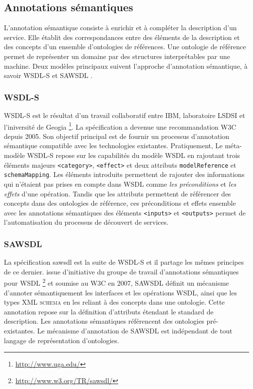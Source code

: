   \subsection{Annotations sémantiques}
  \label{sec:semantic-annot}

  L'annotation sémantique consiste à enrichir et à compléter la
  description d'un service. Elle établit des correspondances entre des
  éléments de la description et des concepts d'un ensemble
  d'ontologies de références. Une ontologie de référence permet de
  représenter un domaine par des structures interprétables par une
  machine. Deux modèles principaux suivent l'approche d'annotation
  sémantique, à savoir \textsc{WSDL-S} et \textsc{SAWSDL}
  \cite{elie2010}.

    \subsubsection{WSDL-S}
    \textsc{WSDL-S} \cite{akkiraju2005web} est le résultat d'un
    travail collaboratif entre IBM, laboratoire LSDSI et l'iniversité
    de Geogia \footnote{\url{http://www.uga.edu/}}.  La spécification
    a devenue une recommandation \textsc{W3C} depuis 2005. Son
    objectif principal est de fournir un processus d'annotation
    sémantique compatible avec les technologies
    existantes. Pratiquement, Le méta-modèle \textsc{WSDL-S} repose
    sur les capabilités du modèle \textsc{WSDL} en rajoutant trois
    éléments majeurs \texttt{<category>}, \texttt{<effect>} et deux
    attributs \texttt{modelReference} et \texttt{schemaMapping}. Les
    éléments introduits permettent de rajouter des informations qui
    n'étaient pas prises en compte dans \textsc{WSDL} comme \emph{les
      préconditions} et \emph{les effets} d'une opération. Tandis que
    les attributs permettent de référencer des concepts dans des
    ontologies de référence, ces préconditions et effets ensemble avec
    les annotations sémantiques des éléments \texttt{<inputs>} et
    \texttt{<outputs>} permet de l'automatisation du processus de
    découvert de services.

    \subsubsection{SAWSDL}
    La spécification \acrshort{sawsdl} \cite{kopecky2007sawsdl} est la
    suite de \textsc{WSDL-S} et il partage les mêmes principes de ce
    dernier. issue d'initiative du groupe de travail d'annotations
    sémantiques pour \textsc{WSDL}
    \footnote{\url{http://www.w3.org/TR/sawsdl/}} et soumise au
    \textsc{W3C} en 2007, \textsc{SAWSDL} définit un mécanisme
    d'annoter sémantiquement les interfaces et les opérations
    \textsc{WSDL}, ainsi que les types \textsc{XML schema} en les
    reliant à des concepts dans une ontologie. Cette annotation repose
    sur la définition d'attributs étendant le standard de
    description. Les annotations sémantiques référencent des
    ontologies pré-existantes. Le mécanisme d'annotation de
    \textsc{SAWSDL} est indépendant de tout langage de représentation
    \cite{lopez2008selection} d'ontologies.

